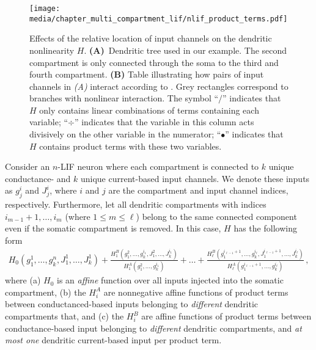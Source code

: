 \begin{figure}
	\centering
	\texttt{[image: media/chapter\_multi\_compartment\_lif/nlif\_product\_terms.pdf]}
	\caption[Effects of the relative location of input channels on the dendritic nonlinearity $H$]{Effects of the relative location of input channels on the dendritic nonlinearity $H$. \textbf{(A)}~Dendritic tree used in our example.
	The second compartment is only connected through the soma to the third and fourth compartment.
	\textbf{(B)} Table illustrating how pairs of input channels in \emph{(A)} interact according to .
	Grey rectangles correspond to branches with nonlinear interaction.
	The symbol \enquote{$/$} indicates that $H$ only contains linear combinations of terms containing each variable; \enquote{$\div$} indicates that the variable in this column acts divisively on the other variable in the numerator; \enquote{$\bullet$} indicates that $H$ contains product terms with these two variables.}
	\label{fig:nlif_product_terms}
\end{figure}

\begin{theorem}
\label{thm:nlif_product_terms}
Consider an $n$-LIF neuron where each compartment is connected to $k$ unique con\-duc\-tance- and $k$ unique current-based input channels.
We denote these inputs as $g_j^i$ and $J_j^i$, where $i$ and $j$ are the compartment and input channel indices, respectively.
Furthermore, let all dendritic compartments with indices $i_{m - 1} + 1, \ldots, i_{m}$ (where $1 \leq m \leq \ell$) belong to the same connected component even if the somatic compartment is removed.
In this case, $H$ has the following form
\begin{align}
	H_0(g_1^1, \ldots, g_k^n, J_1^1, \ldots, J_k^1) +
	\frac{H^B_1(
		g_1^{2}, \ldots, g_k^{i_1} \!,
		J_1^{2}, \ldots, J_k^{i_1})
	}{
		H^A_1(g_1^{2}, \ldots, g_k^{i_1})
	}
	+ \ldots +
	\frac{H^B_\ell(
		g_1^{i_{\ell - 1} + 1}, \ldots, g_k^{i_\ell},
		J_1^{i_{\ell - 1} + 1}, \ldots, J_k^{i_\ell})
	}{
		H^A_\ell(g_1^{i_{\ell - 1} + 1}, \ldots, g_k^{i_\ell})
	} \,,
	\label{eqn:nlif_product_terms}
\end{align}
where (a) $H_0$ is an \emph{affine} function over all inputs injected into the somatic compartment, (b) the $H^A_i$ are nonnegative affine functions of product terms between conductanced-based inputs belonging to \emph{different} dendritic compartments that, and (c) the $H^B_i$ are affine functions of product terms between conductance-based input belonging to \emph{different} dendritic compartments, and \emph{at most one} dendritic current-based input per product term.
\end{theorem}

